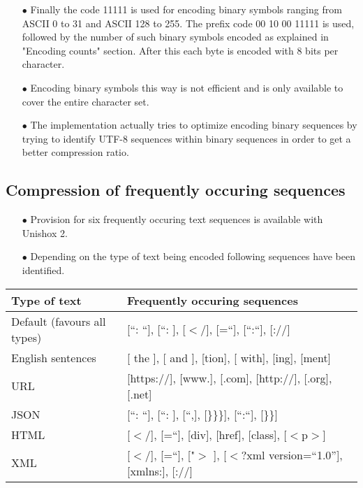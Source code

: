 \documentclass[]{article}
\begin{document}
\begin{itemize}
	\item[$\bullet$] Finally the code 11111 is used for encoding binary symbols ranging from ASCII 0 to 31 and ASCII 128 to 255. The prefix code 00 10 00 11111 is used, followed by the number of such binary symbols encoded as explained in "Encoding counts" section. After this each byte is encoded with 8 bits per character.
	\item[$\bullet$] Encoding binary symbols this way is not efficient and is only available to cover the entire character set.
	\item[$\bullet$] The implementation actually tries to optimize encoding binary sequences by trying to identify UTF-8 sequences within binary sequences in order to get a better compression ratio. 
\end{itemize}

\subsection{Compression of frequently occuring sequences}
\begin{itemize}
	\item[$\bullet$] Provision for six frequently occuring text sequences is available with Unishox 2.
	\item[$\bullet$] Depending on the type of text being encoded following sequences have been identified.
\end{itemize}
\begin{tabular}{ | l | l |} \hline
	﻿\textbf{Type of text} & ﻿\textbf{Frequently occuring sequences} \\ \hline
	Default (favours all types) & [\textquotedblleft: \textquotedblleft], [\textquotedblleft: ], [$<$/], [=\textquotedblleft], [\textquotedblleft:\textquotedblleft], [://] \\ \hline
	English sentences & [ the ], [ and ], [tion], [ with], [ing], [ment] \\ \hline
	URL & [https://], [www.], [.com], [http://], [.org], [.net] \\ \hline
	JSON & [\textquotedblleft: \textquotedblleft], [\textquotedblleft: ], [\textquotedblleft,], [\}\}\}], [\textquotedblleft:\textquotedblleft], [\}\}] \\ \hline
	HTML & [$<$/], [=\textquotedblleft], [div], [href], [class], [$<$p$>$] \\ \hline
	XML & [$<$/], [=\textquotedblleft], ["$>$ ], [$<$?xml version=\textquotedblleft1.0\textquotedblright], [xmlns:], [://] \\ \hline
\end{tabular}
\end{document}
